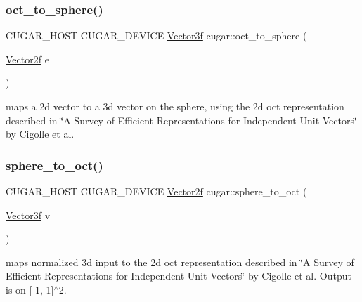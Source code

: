 \subsubsection{\texorpdfstring{oct\+\_\+to\+\_\+sphere()}{oct\_to\_sphere()}}
{\footnotesize\ttfamily C\+U\+G\+A\+R\+\_\+\+H\+O\+ST C\+U\+G\+A\+R\+\_\+\+D\+E\+V\+I\+CE \hyperlink{structcugar_1_1_vector}{Vector3f} cugar\+::oct\+\_\+to\+\_\+sphere (\begin{DoxyParamCaption}\item[{\hyperlink{structcugar_1_1_vector}{Vector2f}}]{e }\end{DoxyParamCaption})\hspace{0.3cm}{\ttfamily [inline]}}

maps a 2d vector to a 3d vector on the sphere, using the 2d oct representation described in \char`\"{}\+A Survey of Efficient Representations for Independent Unit Vectors\char`\"{} by Cigolle et al. \mbox{\label{group__spherical__mappings_gad4cb74d8c6a86fdaf44bce3961fde975}} 
\subsubsection{\texorpdfstring{sphere\+\_\+to\+\_\+oct()}{sphere\_to\_oct()}}
{\footnotesize\ttfamily C\+U\+G\+A\+R\+\_\+\+H\+O\+ST C\+U\+G\+A\+R\+\_\+\+D\+E\+V\+I\+CE \hyperlink{structcugar_1_1_vector}{Vector2f} cugar\+::sphere\+\_\+to\+\_\+oct (\begin{DoxyParamCaption}\item[{\hyperlink{structcugar_1_1_vector}{Vector3f}}]{v }\end{DoxyParamCaption})\hspace{0.3cm}{\ttfamily [inline]}}

maps normalized 3d input to the 2d oct representation described in \char`\"{}\+A Survey of Efficient Representations for Independent Unit Vectors\char`\"{} by Cigolle et al. Output is on \mbox{[}-\/1, 1\mbox{]}$^\wedge$2. \mbox{\label{group__spherical__mappings_gab558fab9acdf1ea100f19dff7c6215c4}} 
